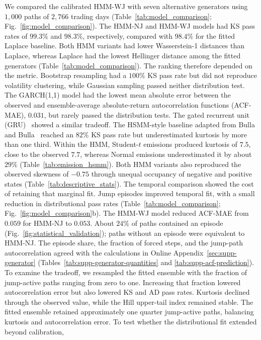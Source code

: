 We compared the calibrated HMM-WJ with seven alternative generators
using $1{,}000$ paths of $2{,}766$ trading days
(Table~\ref{tab:model_comparison}; Fig.~\ref{fig:model_comparison}).
The HMM-NJ and HMM-WJ models had KS pass rates of $99.3\%$ and
$98.3\%$, respectively, compared with $98.4\%$ for the fitted
Laplace baseline. Both HMM variants had lower Wasserstein-1 distances
than Laplace, whereas Laplace had the lowest Hellinger distance among
the fitted generators (Table~\ref{tab:model_comparison}). The
ranking therefore depended on the metric. Bootstrap resampling had a
$100\%$ KS pass rate but did not reproduce volatility clustering,
while Gaussian sampling passed neither distribution test.
The GARCH(1,1) model had the lowest mean absolute error between the
observed and ensemble-average absolute-return autocorrelation
functions (ACF-MAE), $0.031$, but rarely passed the distribution
tests. The gated recurrent unit (GRU)~\cite{choEtAl2014gru}
showed a similar tradeoff. The HSMM-style baseline adapted from Bulla
and Bulla~\cite{bullaBulla2006} reached an $82\%$ KS pass rate but
underestimated kurtosis by more than one third. Within the HMM,
Student-$t$ emissions produced kurtosis of $7.5$, close to the
observed $7.7$, whereas Normal emissions underestimated it by about
$29\%$ (Table~\ref{tab:emission_hsmm}). Both HMM variants also
reproduced the observed skewness of $-0.75$ through unequal occupancy
of negative and positive states (Table~\ref{tab:descriptive_stats}).
The temporal comparison showed the cost of retaining that marginal fit.
Jump episodes improved temporal fit, with a small reduction in
distributional pass rates (Table~\ref{tab:model_comparison};
Fig.~\ref{fig:model_comparison}b). The HMM-WJ model reduced ACF-MAE from
$0.059$ for HMM-NJ to $0.053$. About $24\%$ of paths contained an
episode (Fig.~\ref{fig:statistical_validation}); paths without an
episode were equivalent to HMM-NJ. The
episode share, the fraction of forced steps, and the jump-path
autocorrelation agreed with the calculations in Online
Appendix~\ref{sec:supp-generator}
(Tables~\ref{tab:supp-generator-quantities} and
\ref{tab:supp-acf-prediction}). To examine the tradeoff, we
resampled the fitted ensemble with the fraction of jump-active paths
ranging from zero to one. Increasing that fraction lowered
autocorrelation error but also lowered KS and AD pass rates.
Kurtosis declined through the observed value, while the Hill
upper-tail index remained stable. The fitted ensemble retained approximately one quarter jump-active
paths, balancing kurtosis and autocorrelation error.
To test whether the distributional fit extended beyond calibration,
